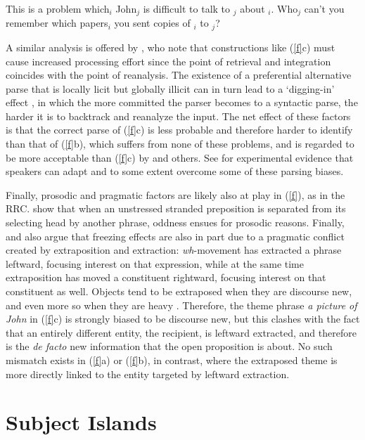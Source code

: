 \documentclass[output=paper]{langsci/langscibook}
\begin{document}
\ea
\ea This is a problem which$_i$ John$_j$ is difficult 
to talk to  \spc$_j$ about \spc$_i$.
\ex Who$_j$  can't  you remember which papers$_i$ 
you sent copies of \spc$_i$ to \spc$_j$?
\z \label{ddg}
\z

\noindent
A similar analysis is offered by \citet[477]{freezing}, who note that  constructions like (\ref{f}c) must cause increased processing effort since the point of retrieval and integration coincides with the point of reanalysis. The existence of a preferential alternative parse that is locally licit but globally illicit  can in turn lead to a  `digging-in' effect \citep{ferreirahend,ferreirahend2,tabor3}, in which the  more committed the parser  becomes to a syntactic parse, the  harder it is to backtrack and reanalyze the  input. The net effect of these factors is that the correct parse of
(\ref{f}c) is less probable and therefore harder to identify than that of  (\ref{f}b), which suffers from none of  these problems, and is  regarded to be more acceptable than
 (\ref{f}c) by \citet[453]{fodor78} and others. See \citet{chavesf} for experimental evidence that speakers
 can adapt and to some extent overcome some of these parsing biases.
 
 Finally, prosodic and pragmatic factors are likely also at  play in (\ref{f}), as in the RRC. \citet{huck} show that when an unstressed stranded preposition  is separated from its selecting head by another phrase, oddness ensues for prosodic reasons.  Finally,  \citet{huck} and  \citet{boling92} also
 argue that freezing effects are also in part due to a pragmatic conflict created by extraposition and extraction: {\it wh}-movement has extracted a phrase leftward, focusing interest on that expression, while at the same time extraposition has moved a constituent rightward,  focusing interest on that constituent as well.  
Objects tend to be extraposed when they are discourse new, and even more so when they are heavy \citep[71]{wasowbook}. Therefore, the theme phrase {\it a picture of John} in (\ref{f}c) is strongly biased to be discourse new,  but this clashes with the fact that an entirely different entity, the recipient, is leftward extracted, and therefore is the {\it de facto} new information that the open proposition is about.  No such mismatch exists in (\ref{f}a) or (\ref{f}b), in contrast, where the extraposed theme is more directly linked to the  entity targeted by leftward extraction.


\section{Subject Islands}
\end{document}
